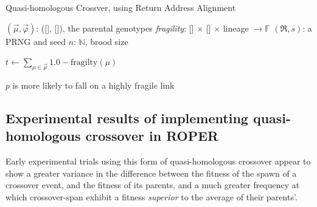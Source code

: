 \documentclass[12pt,glossary]{dalthesis}
\begin{document}
\begin{algorithm}
\caption{Quasi-homologous Crossver, using Return Address Alignment}
\label{alg:crossover-homo}
\begin{algorithmic}[1]

\REQUIRE $(\vec{\mu}, \vec{\varphi})$: ([\!], [\!]), the parental genotypes 
\REQUIRE \emph{fragility}: [\!] $\times$ [\!] $\times$ lineage $\to \mathbb{F}$ 
\REQUIRE $(\mathfrak{R}, s)$: a PRNG and seed 
\REQUIRE $n$: $\mathbb{N}$, brood size



\STATE
{$t \gets \sum_{\mu \in \vec{\mu}} 1.0 - \text{fragilty}(\mu)$}

 \COMMENT
{$p$ is more likely to fall on a highly fragile link} 

\ENDWHILE 


\ELSE 
\ENDIF

 
 
\end{algorithmic} 
\end{algorithm}

\subsection{Experimental results of implementing quasi-homologous crossover in ROPER}
\label{sec:orgbabd4af}

Early experimental trials using this form of quasi-homologous crossover appear
to show a greater variance in the difference between the fitness of the spawn
of a crossover event, and the fitness of its parents, and a much greater
frequency at which crossover-span exhibit a fitness \emph{superior} to the average
of their parents'. 
\end{document}
